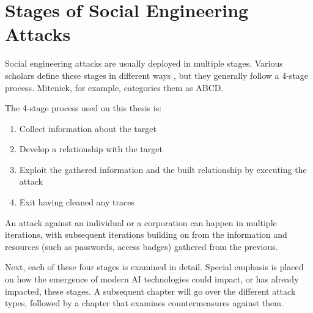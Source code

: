 



\chapter{Stages of Social Engineering Attacks\label{stages}}
\begin{comment}

Guides:
    - About 2 pages

TODO:
    [ ] Cover how SE attacks are cyclical

What to cover:
    - The 4-Stage process of SE
        - Gather OSINT
        - Build relationship
        - Exploit relationship / launch the attack
        - Exit / cover traces
    - Cyclical nature of SE attacks
    
Literature:
    - 

\end{comment}

Social engineering attacks are usually deployed in multiple stages. Various scholars define these stages in different ways \citep{mouton_social_2016}, but they generally follow a 4-stage process. Mitcnick, for example, categories them as ABCD.

The 4-stage process used on this thesis is:

\begin{enumerate}
    \item Collect information about the target
    \item Develop a relationship with the target
    \item Exploit the gathered information and the built relationship by executing the attack
    \item Exit having cleaned any traces
\end{enumerate}

An attack against an individual or a corporation can happen in multiple iterations, with subsequent iterations building on from the information and resources (such as passwords, access badges) gathered from the previous.

Next, each of these four stages is examined in detail. Special emphasis is placed on how the emergence of modern AI technologies could impact, or has already impacted, these stages. A subsequent chapter will go over the different attack types, followed by a chapter that examines countermeasures against them.

